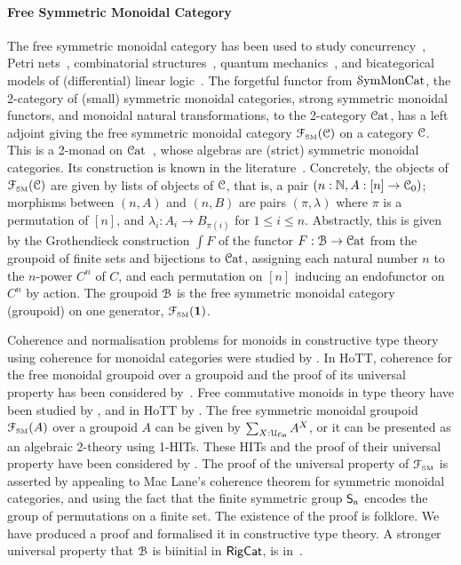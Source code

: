 \paragraph{Free Symmetric Monoidal Category} The free symmetric monoidal category has been used to study
concurrency~\cite{hylandSymmetricMonoidalSketches2004}, Petri nets~\cite{baezCategoriesNets2021}, combinatorial
structures~\cite{fioreCartesianClosedBicategory2008}, quantum mechanics~\cite{abramskyAbstractScalarsLoops2005}, and
bicategorical models of (differential) linear logic~\cite{melliesTemplateGamesDifferential2019}. The forgetful functor
from $\SymMonCat$, the 2-category of (small) symmetric monoidal categories, strong symmetric monoidal functors, and
monoidal natural transformations, to the 2-category $\CatCat$, has a left adjoint giving the free symmetric monoidal
category $\FSM[\CCat{C}]$ on a category $\CCat{C}$. This is a 2-monad on
$\CatCat$~\cite{blackwellTwodimensionalMonadTheory1989}, whose algebras are (strict) symmetric monoidal categories. Its
construction is known in the literature~\cite{abramskyAbstractScalarsLoops2005}.  Concretely, the objects of
$\FSM[\CCat{C}]$ are given by lists of objects of $\CCat{C}$, that is, a pair $(n:\Nat, A:[n] \to \CCat{C}_{0})$;
morphisms between $(n,A)$ and $(n,B)$ are pairs $(\pi,\lambda)$ where $\pi$ is a permutation of $[n]$, and
$\lambda_{i} : A_{i} \to B_{\pi(i)}$ for $1 \leq i \leq n$. Abstractly, this is given by the Grothendieck construction
$\int F$ of the functor $F : \BFin \to \CatCat$ from the groupoid of finite sets and bijections to $\CatCat$, assigning
each natural number $n$ to the $n$-power $C^{n}$ of $C$, and each permutation on $[n]$ inducing an endofunctor on
$C^{n}$ by action. The groupoid $\BFin$ is the free symmetric monoidal category (groupoid) on one generator, $\FSM[\unit]$.

Coherence and normalisation problems for monoids in constructive type theory using coherence for monoidal categories
were studied by \citet{beylinExtractingProofCoherence1996}. In HoTT, coherence for the free monoidal groupoid over a
groupoid and the proof of its universal property has been considered
by~\citet{piceghelloCoherenceMonoidalGroupoids2020}. Free commutative monoids in type theory have been studied by
\citet{gylterudMultisetsTypeTheory2020}, and in HoTT by
\citet*{choudhuryFinitemultisetConstructionHoTT2019,choudhuryFreeCommutativeMonoids2021}. The free symmetric monoidal
groupoid $\FSM[A]$ over a groupoid $A$ can be given by $\dsum*{X:\UFin}{A^{X}}$, or it can be presented as an algebraic
2-theory using 1-HITs. These HITs and the proof of their universal property have been considered by
\citet*{piceghelloCoherenceSymmetricMonoidal2019,choudhuryFinitemultisetConstructionHoTT2019}. The proof of the
universal property of $\FSM$ is asserted by appealing to Mac Lane's coherence theorem for symmetric monoidal categories,
and using the fact that the finite symmetric group $\Sn$ encodes the group of permutations on a finite set. The existence of
the proof is folklore. We have produced a proof and formalised it in constructive type theory. A stronger universal
property that $\BFin$ is biinitial in $\operatorname{\mathsf{RigCat}}$, is in~\cite{elguetaGroupoidFiniteSets2021}.

